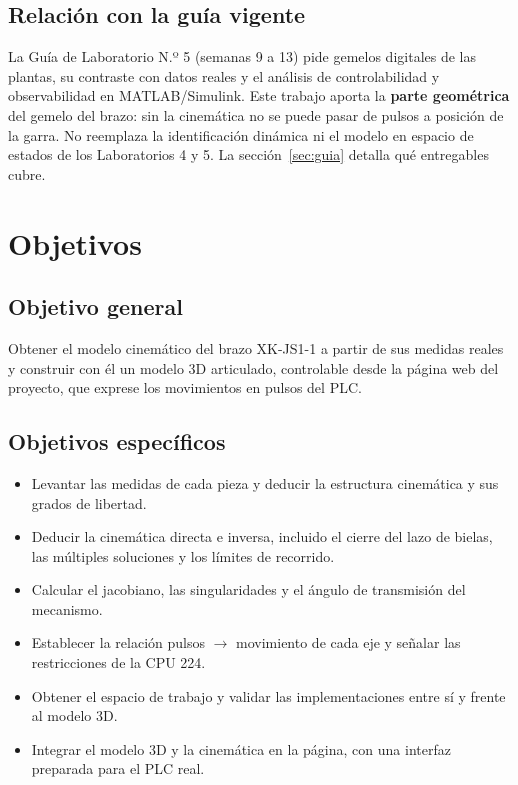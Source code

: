 \documentclass[a4paper,12pt]{article}
\begin{document}
\subsection{Relación con la guía vigente}
La Guía de Laboratorio N.º 5 (semanas 9 a 13) pide gemelos digitales de las plantas, su contraste con datos
reales y el análisis de controlabilidad y observabilidad en MATLAB/Simulink. Este trabajo aporta la
\textbf{parte geométrica} del gemelo del brazo: sin la cinemática no se puede pasar de pulsos a posición
de la garra. No reemplaza la identificación dinámica ni el modelo en espacio de estados de los Laboratorios 4
y 5. La sección~\ref{sec:guia} detalla qué entregables cubre.

\section{Objetivos}
\subsection{Objetivo general}
Obtener el modelo cinemático del brazo XK-JS1-1 a partir de sus medidas reales y construir con él un modelo
3D articulado, controlable desde la página web del proyecto, que exprese los movimientos en pulsos del PLC.

\subsection{Objetivos específicos}
\begin{itemize}
\item Levantar las medidas de cada pieza y deducir la estructura cinemática y sus grados de libertad.
\item Deducir la cinemática directa e inversa, incluido el cierre del lazo de bielas, las múltiples
      soluciones y los límites de recorrido.
\item Calcular el jacobiano, las singularidades y el ángulo de transmisión del mecanismo.
\item Establecer la relación pulsos $\rightarrow$ movimiento de cada eje y señalar las restricciones de la CPU 224.
\item Obtener el espacio de trabajo y validar las implementaciones entre sí y frente al modelo 3D.
\item Integrar el modelo 3D y la cinemática en la página, con una interfaz preparada para el PLC real.
\end{itemize}
\end{document}
